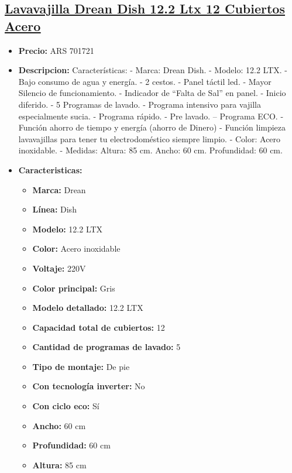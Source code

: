 \documentclass{article}
\begin{document}
    \begin{adjustwidth}{2em}{}

    \subsection{\underline{\href{https://www.mercadolibre.com.ar/lavavajilla-drean-dish-122-ltx-12-cubiertos-acero/p/MLA23619580}{Lavavajilla Drean Dish 12.2 Ltx 12 Cubiertos Acero}}}
    \begin{itemize}
        \item \textbf{Precio:} ARS 701721
        \item \textbf{Descripcion:} Características:
- Marca: Drean Dish.
- Modelo: 12.2 LTX.
- Bajo consumo de agua y energía.
- 2 cestos.
- Panel táctil led.
- Mayor Silencio de funcionamiento.
- Indicador de “Falta de Sal” en panel.
- Inicio diferido.
- 5 Programas de lavado.
- Programa intensivo para vajilla especialmente sucia.
- Programa rápido.
- Pre lavado.
– Programa ECO.
- Función ahorro de tiempo y energía (ahorro de Dinero)
- Función limpieza lavavajillas para tener tu electrodoméstico siempre limpio.
- Color: Acero inoxidable.
- Medidas: Altura: 85 cm. Ancho: 60 cm. Profundidad: 60 cm.
        \item \textbf{Caracteristicas:} 
        \begin{itemize}
            \item \textbf {Marca:} Drean
    \item \textbf {Línea:} Dish
    \item \textbf {Modelo:} 12.2 LTX
    \item \textbf {Color:} Acero inoxidable
    \item \textbf {Voltaje:} 220V
    \item \textbf {Color principal:} Gris
    \item \textbf {Modelo detallado:} 12.2 LTX
    \item \textbf {Capacidad total de cubiertos:} 12
    \item \textbf {Cantidad de programas de lavado:} 5
    \item \textbf {Tipo de montaje:} De pie
    \item \textbf {Con tecnología inverter:} No
    \item \textbf {Con ciclo eco:} Sí
    \item \textbf {Ancho:} 60 cm
    \item \textbf {Profundidad:} 60 cm
    \item \textbf {Altura:} 85 cm

\end{itemize}
\end{itemize}
\end{adjustwidth}
\end{document}
